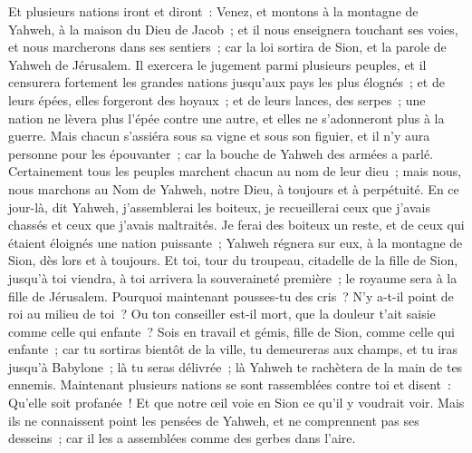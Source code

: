 \begin{multicols}{2}
Et plusieurs nations iront et diront~: Venez, et montons à la montagne de Yahweh, à la maison du Dieu de Jacob~; et il nous enseignera touchant ses voies, et nous marcherons dans ses sentiers~; car la loi sortira de Sion, et la parole de Yahweh de Jérusalem.
Il exercera le jugement parmi plusieurs peuples, et il censurera fortement les grandes nations jusqu'aux pays les plus élognés~; et de leurs épées, elles forgeront des hoyaux~; et de leurs lances, des serpes~; une nation ne lèvera plus l'épée contre une autre, et elles ne s'adonneront plus à la guerre.
Mais chacun s'assiéra sous sa vigne et sous son figuier, et il n'y aura personne pour les épouvanter~; car la bouche de Yahweh des armées a parlé.
Certainement tous les peuples marchent chacun au nom de leur dieu~; mais nous, nous marchons au Nom de Yahweh, notre Dieu, à toujours et à perpétuité.
En ce jour-là, dit Yahweh, j'assemblerai les boiteux, je recueillerai ceux que j'avais chassés et ceux que j'avais maltraités.
Je ferai des boiteux un reste, et de ceux qui étaient éloignés une nation puissante~; Yahweh régnera sur eux, à la montagne de Sion, dès lors et à toujours.
Et toi, tour du troupeau, citadelle de la fille de Sion, jusqu'à toi viendra, à toi arrivera la souveraineté première~; le royaume sera à la fille de Jérusalem.
Pourquoi maintenant pousses-tu des cris~? N'y a-t-il point de roi au milieu de toi~? Ou ton conseiller est-il mort, que la douleur t'ait saisie comme celle qui enfante~?
Sois en travail et gémis, fille de Sion, comme celle qui enfante~; car tu sortiras bientôt de la ville, tu demeureras aux champs, et tu iras jusqu'à Babylone~; là tu seras délivrée~; là Yahweh te rachètera de la main de tes ennemis.
Maintenant plusieurs nations se sont rassemblées contre toi et disent~: Qu'elle soit profanée~! Et que notre œil voie en Sion ce qu'il y voudrait voir.
Mais ils ne connaissent point les pensées de Yahweh, et ne comprennent pas ses desseins~; car il les a assemblées comme des gerbes dans l'aire.

\end{multicols}
